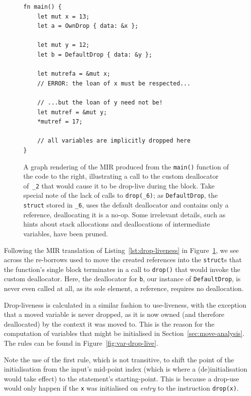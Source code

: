 \documentclass[11pt,a4paper,twoside,openany,draft]{report}
\newenvironment{sourcecode}{\captionsetup{type=listing}}{}
\newcommand{\InRust}[1]{\texttt{#1}}
\begin{document}
\begin{figure}
\begin{minipage}{.5\textwidth}
\begin{sourcecode}
\begin{verbatim}
fn main() {
    let mut x = 13;
    let a = OwnDrop { data: &x };

    let mut y = 12;
    let b = DefaultDrop { data: &y };
    
    let mutrefa = &mut x;
    // ERROR: the loan of x must be respected...
    
    // ...but the loan of y need not be!
    let mutref = &mut y;
    *mutref = 17;
    
    // all variables are implicitly dropped here
}
\end{verbatim}
\end{sourcecode}
\end{minipage}
\caption[MIR of a Program Utilising a Custom Deallocator]{A graph rendering of
  the MIR produced from the \InRust{main()} function of the code to the right,
  illustrating a call to the custom deallocator of~\InRust{_2} that would cause
  it to be drop-live during the block. Take special note of the lack of calls to
  \InRust{drop(_6)}; as \InRust{DefaultDrop}, the \InRust{struct} stored in
  \InRust{_6}, uses the default deallocator and contains only a reference,
  deallocating it is a no-op. Some irrelevant details, such as hints about stack
  allocations and deallocations of intermediate variables, have been pruned.}\label{fig:drop-liveness}
\end{figure}

Following the MIR translation of Listing~\ref{lst:drop-liveness} in
Figure~\ref{fig:drop-liveness}, we see across the re-borrows used to move the
created references into the \InRust{struct}s that the function's single block
terminates in a call to \InRust{drop()} that would invoke the custom
deallocator. Here, the deallocator for \InRust{b}, our instance of
\InRust{DefaultDrop}, is never even called at all, as its sole element, a
reference, requires no deallocation.

Drop-liveness is calculated in a similar fashion to use-liveness, with the
exception that a moved variable is never dropped, as it is now owned (and
therefore deallocated) by the context it was moved to. This is the reason for
the computation of variables that might be initialised in
Section~\ref{sec:move-analysis}. The rules can be found in
Figure~\ref{fig:var-drop-live}.

Note the use of the first rule, which is not transitive, to shift the point of
the initialisation from the input's mid-point index (which is where a
(de)initialisation would take effect) to the statement's starting-point. This is
because a drop-use would only happen if the \InRust{x} was initialised on
\textit{entry} to the instruction \InRust{drop(x)}.
\end{document}
